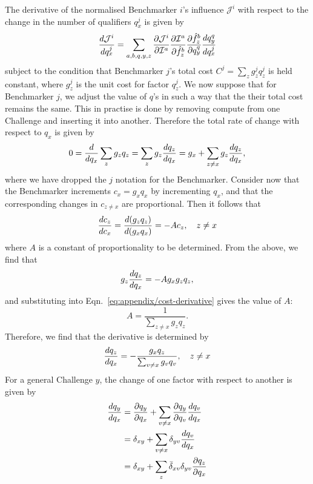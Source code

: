 The derivative of the normalised Benchmarker $i$'s influence $\mathcal{J}^i$ with respect to the change in the number of qualifiers $q^j_x$ is given by
\begin{equation}
    \frac{d \mathcal{J}^i}{d q^j_x} = \sum_{a,b,q,y,z} \frac{\partial \mathcal{J}^i}{\partial \mathcal{I}^a} \frac{\partial \mathcal{I}^a}{\partial \hat{f}_z^b} \frac{\partial \hat{f}_z^b}{\partial q^q_y} \frac{d q^q_y}{d q^j_x}
\end{equation}
subject to the condition that Benchmarker $j$'s total cost $C^j = \sum_z g^j_z q^j_z$ is held constant, where $g^j_z$ is the unit cost for factor $q^j_z$. 
We now suppose that for Benchmarker $j$, we adjust the value of $q$'s in such a way that the their total cost remains the same. 
This in practise is done by removing compute from one Challenge and inserting it into another. 
Therefore the total rate of change with respect to $q_x$ is given by 
\begin{equation}
    0 = \frac{d }{d q_x}\sum_z g_z q_z = \sum_z g_z \frac{d q_z}{d q_x} = g_x + \sum_{z\neq x} g_z \frac{d q_z}{d q_x},
    \label{eq:appendix/cost-derivative}
\end{equation}
where we have dropped the $j$ notation for the Benchmarker. 
Consider now that the Benchmarker increments $c_x = g_x q_x$ by incrementing $q_x$, and that the corresponding changes in $c_{z\neq x}$ are proportional. 
Then it follows that 
\begin{equation}
    \frac{d c_z}{d c_x} = \frac{d (g_z q_z)}{d (g_x q_x)} = -A c_z, \quad z \neq x
\end{equation}
where $A$ is a constant of proportionality to be determined. 
From the above, we find that
\begin{equation}
    g_z \frac{d q_z}{d q_x} = -A g_x g_z q_z,
\end{equation}
and substituting into Eqn.~\ref{eq:appendix/cost-derivative} gives the value of $A$:
\begin{equation}
    A = \frac{1}{\sum_{z\neq x} g_z q_z}.
\end{equation}
Therefore, we find that the derivative is determined by
\begin{equation}
    \frac{d q_z}{d q_x} = - \frac{g_x q_z}{\sum_{v \neq x} g_v q_v}, \quad z \neq x
\end{equation}
For a general Challenge $y$, the change of one factor with respect to another is given by 
\begin{align}
    \frac{d q_y}{d q_x} &= \frac{\partial q_y}{\partial q_x} + \sum_{v \neq x} \frac{\partial q_y}{\partial q_v} \frac{d q_v}{d q_x} \\
    &= \delta_{xy} + \sum_{v\neq x} \delta_{yv} \frac{d q_v}{d q_x} \\ 
    &= \delta_{xy} + \sum_z \bar{\delta}_{xv}\delta_{yv}\frac{\partial q_z}{\partial q_x}
\end{align}
